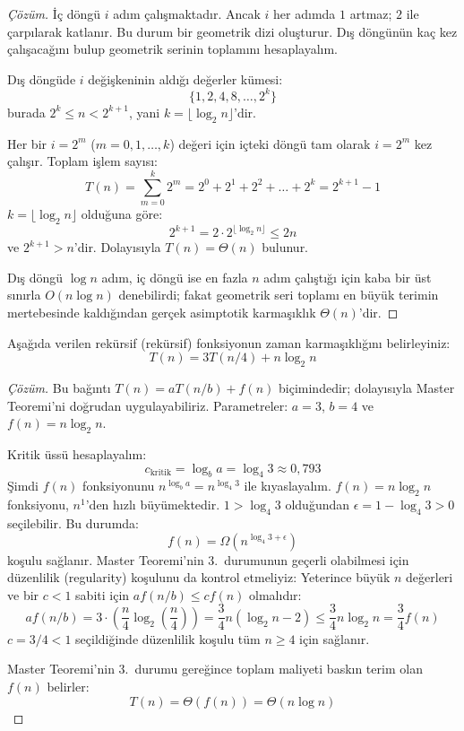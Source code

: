 \begin{proof}[Çözüm]
İç döngü $i$ adım çalışmaktadır. Ancak $i$ her adımda $1$ artmaz; $2$ ile çarpılarak katlanır. Bu durum bir geometrik dizi oluşturur. Dış döngünün kaç kez çalışacağını bulup geometrik serinin toplamını hesaplayalım.

Dış döngüde $i$ değişkeninin aldığı değerler kümesi:
\[
\{1, 2, 4, 8, \dots, 2^k\}
\]
burada $2^k \le n < 2^{k+1}$, yani $k = \lfloor \log_2 n \rfloor$'dir.

Her bir $i = 2^m$ ($m = 0, 1, \dots, k$) değeri için içteki döngü tam olarak $i = 2^m$ kez çalışır. Toplam işlem sayısı:
\[
T(n) = \sum_{m=0}^k 2^m = 2^0 + 2^1 + 2^2 + \dots + 2^k = 2^{k+1} - 1
\]
$k = \lfloor \log_2 n \rfloor$ olduğuna göre:
\[
2^{k+1} = 2 \cdot 2^{\lfloor \log_2 n \rfloor} \le 2n
\]
ve $2^{k+1} > n$'dir. Dolayısıyla $T(n) = \Theta(n)$ bulunur.

Dış döngü $\log n$ adım, iç döngü ise en fazla $n$ adım çalıştığı için kaba bir üst sınırla $O(n \log n)$ denebilirdi; fakat geometrik seri toplamı en büyük terimin mertebesinde kaldığından gerçek asimptotik karmaşıklık $\Theta(n)$'dir.
\end{proof}

\begin{example}
Aşağıda verilen rekürsif (rekürsif) fonksiyonun zaman karmaşıklığını belirleyiniz:
\[
T(n) = 3 T(n/4) + n \log_2 n
\]
\end{example}

\begin{proof}[Çözüm]
Bu bağıntı $T(n) = a T(n/b) + f(n)$ biçimindedir; dolayısıyla Master Teoremi'ni doğrudan uygulayabiliriz. Parametreler: $a = 3$, $b = 4$ ve $f(n) = n \log_2 n$.

Kritik üssü hesaplayalım:
\[
c_{\text{kritik}} = \log_b a = \log_4 3 \approx 0{,}793
\]
Şimdi $f(n)$ fonksiyonunu $n^{\log_b a} = n^{\log_4 3}$ ile kıyaslayalım. $f(n) = n \log_2 n$ fonksiyonu, $n^1$'den hızlı büyümektedir. $1 > \log_4 3$ olduğundan $\epsilon = 1 - \log_4 3 > 0$ seçilebilir. Bu durumda:
\[
f(n) = \Omega\left(n^{\log_4 3 + \epsilon}\right)
\]
koşulu sağlanır. Master Teoremi'nin 3.~durumunun geçerli olabilmesi için düzenlilik (regularity) koşulunu da kontrol etmeliyiz: Yeterince büyük $n$ değerleri ve bir $c < 1$ sabiti için $a f(n/b) \le c f(n)$ olmalıdır:
\[
a f(n/b) = 3 \cdot \left(\frac{n}{4} \log_2\left(\frac{n}{4}\right)\right) = \frac{3}{4} n (\log_2 n - 2) \le \frac{3}{4} n \log_2 n = \frac{3}{4} f(n)
\]
$c = 3/4 < 1$ seçildiğinde düzenlilik koşulu tüm $n \ge 4$ için sağlanır.

Master Teoremi'nin 3.~durumu gereğince toplam maliyeti baskın terim olan $f(n)$ belirler:
\[
T(n) = \Theta(f(n)) = \Theta(n \log n)
\]
\end{proof}

